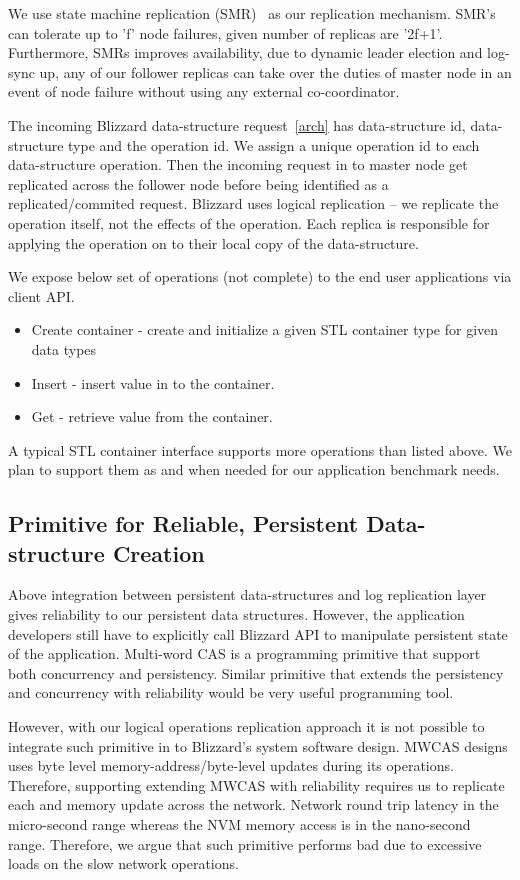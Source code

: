 We use state machine replication (SMR)~\cite{raft} as our replication mechanism. SMR's can tolerate
up to 'f' node failures, given number of replicas are '2f+1'. Furthermore, SMRs improves
availability, due to dynamic leader election and log-sync up, any of our follower replicas
can take over the duties of master node in an event of node failure without using any
external co-coordinator.

The incoming Blizzard data-structure request~\autoref{arch} has data-structure id, data-structure type
and the operation id. We assign a unique operation id to each data-structure operation. 
Then the incoming request in to master node get replicated across the follower node 
before being identified as a replicated/commited request. Blizzard uses logical
replication -- we replicate the operation itself, not the effects of the operation. Each
replica is responsible for applying the operation on to their local copy of the data-structure.

We expose below set of operations (not complete)  to the end user applications via client API.

\begin{itemize}
	\item Create container - create and initialize a given STL container type for given data types
	\item Insert - insert value in to the container.
	\item Get - retrieve value from the container.
\end{itemize}

A typical STL container interface supports more operations than listed above. We plan to support them
as and when needed for our application benchmark needs.

\subsection{Primitive for Reliable, Persistent Data-structure Creation}

Above integration between persistent data-structures and log replication layer
gives reliability to our persistent data structures. However, the application developers 
still have to explicitly call Blizzard API to manipulate persistent state of the application.
Multi-word CAS is a programming primitive that support both concurrency and persistency. Similar
primitive that extends the persistency and concurrency with reliability would be very useful
programming tool.

However, with our logical operations replication approach it is not possible to integrate such
primitive in to Blizzard's system software design. MWCAS designs uses byte level memory-address/byte-level
updates during its operations. Therefore, supporting extending MWCAS with reliability requires us to
replicate each and memory update across the network. Network round trip latency in the micro-second
range whereas the NVM memory access is in the nano-second range. Therefore, we argue that such primitive
performs bad due to excessive loads on the slow network operations.

